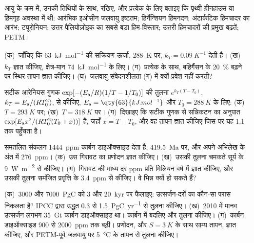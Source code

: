 \begin{exercise}[$\star$]\label{exo:b2:deep-time-climate:4}
आयु के क्रम में, उनकी तिथियों के साथ, रखिए, और प्रत्येक के लिए बताइए कि पृथ्वी ग्रीनहाउस या
हिमगृह अवस्था में थी: आरंभिक इओसीन जलवायु इष्टतम; हिर्नेन्शियन हिमनदन; अंटार्कटिक हिमचादर का
आरंभ; ट्यूरोनियन; उत्तर पैलियोज़ोइक का सबसे बड़ा हिम-विस्तार; उत्तरी हिमचादरों की प्रमुख
बढ़तें; PETM।
\end{exercise}

\begin{exercise}[$\star\star$]\label{exo:b2:deep-time-climate:5}
(क)~जाँचिए कि \qty{63}{kJ.mol^{-1}} की सक्रियण ऊर्जा, \qty{288}{K} पर, $k_T =
\qty{0.09}{K^{-1}}$ देती है। (ख)~$k_T$ ज्ञात कीजिए, क्षेत्र-मान \qty{74}{kJ.mol^{-1}} के लिए। (ग)~प्रत्येक के
साथ, बहिर्गैसन के \qty{20}{\percent} बढ़ने पर स्थिर तापन ज्ञात कीजिए। (घ)~जलवायु
संवेदनशीलता (ग) में क्यों प्रवेश नहीं करती?
\end{exercise}

\begin{exercise}[$\star\star$]\label{exo:b2:deep-time-climate:6}
सटीक आरेनियस गुणक $\exp[-(E_{\text a}/R)(1/T - 1/T_0)]$ की तुलना $e^{k_T(T -
T_0)}$, $k_T = E_{\text a}/(RT_0^2)$, से कीजिए, $E_{\text a} = \qty{63}{kJ.mol^{-1}}$ और $T_0 =
\qty{288}{K}$ के लिए: (क)~$T = \qty{293}{K}$ पर; (ख)~$T = \qty{318}{K}$ पर। (ग)~दिखाइए कि सटीक
गुणक से सन्निकटन का अनुपात $\exp[E_{\text a}x^2/(RT_0^2(T_0 + x))]$ है, जहाँ $x = T - T_0$,
और वह तापन ज्ञात कीजिए जिस पर यह 1.1 तक पहुँचता है।
\end{exercise}

\begin{exercise}[$\star\star$]\label{exo:b2:deep-time-climate:7}
समतलित संकलन \qty{1444}{ppm} कार्बन डाइऑक्साइड देता है, \qty{419.5}{Ma} पर, और अपने अभिलेख के
अंत में \qty{276}{ppm}। (क)~उस गिरावट का प्रणोदन ज्ञात कीजिए। (ख)~उसकी तुलना चमकते सूर्य के
\qty{9}{W.m^{-2}} से कीजिए। (ग)~गिरावट की माध्य दर \unit{ppm} प्रति मिलियन वर्ष में ज्ञात कीजिए, और
उसकी तुलना समंजित प्रवृत्ति के \qty{3.4}{ppm} से कीजिए। वे भिन्न क्यों हो सकते हैं?
\end{exercise}

\begin{exercise}[$\star\star$]\label{exo:b2:deep-time-climate:8}
(क)~\num{3000} और \qty{7000}{PgC} को 3 और \qty{20}{kyr} पर फैलाइए: उत्सर्जन-दरों का कौन-सा परास
निकलता है? IPCC द्वारा उद्धृत 0.3 से \qty{1.5}{PgC.yr^{-1}} से तुलना कीजिए। (ख)~2010 में मानव उत्सर्जन
लगभग \qty{35}{Gt} कार्बन डाइऑक्साइड था। कार्बन में बदलिए और तुलना कीजिए। (ग)~कार्बन
डाइऑक्साइड 900 से \qty{2000}{ppm} तक बढ़ी। प्रणोदन, और $S =
\qty{3}{K}$ के साथ साम्य तापन, ज्ञात कीजिए, और PETM-पूर्व जलवायु पर \qty{5}{\celsius} के तापन से तुलना कीजिए।
\end{exercise}

